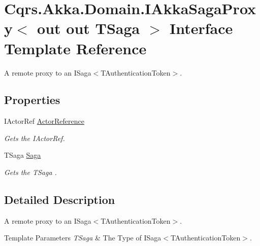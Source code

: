 \hypertarget{interfaceCqrs_1_1Akka_1_1Domain_1_1IAkkaSagaProxy}{}\section{Cqrs.\+Akka.\+Domain.\+I\+Akka\+Saga\+Proxy$<$ out out T\+Saga $>$ Interface Template Reference}
\label{interfaceCqrs_1_1Akka_1_1Domain_1_1IAkkaSagaProxy}


A remote proxy to an I\+Saga$<$\+T\+Authentication\+Token$>$.  


\subsection*{Properties}
\begin{DoxyCompactItemize}
\item 
I\+Actor\+Ref \hyperlink{interfaceCqrs_1_1Akka_1_1Domain_1_1IAkkaSagaProxy_a8edb3e9332787ee3a9059589c85ed9e5_a8edb3e9332787ee3a9059589c85ed9e5}{Actor\+Reference}
\begin{DoxyCompactList}\small\item\em Gets the I\+Actor\+Ref. \end{DoxyCompactList}\item 
T\+Saga \hyperlink{interfaceCqrs_1_1Akka_1_1Domain_1_1IAkkaSagaProxy_adc230a1e98a8f4ed88a4230e0d0702e1_adc230a1e98a8f4ed88a4230e0d0702e1}{Saga}
\begin{DoxyCompactList}\small\item\em Gets the {\itshape T\+Saga} . \end{DoxyCompactList}\end{DoxyCompactItemize}


\subsection{Detailed Description}
A remote proxy to an I\+Saga$<$\+T\+Authentication\+Token$>$. 


\begin{DoxyTemplParams}{Template Parameters}
{\em T\+Saga} & The Type of I\+Saga$<$\+T\+Authentication\+Token$>$.\\
\hline
\end{DoxyTemplParams}


